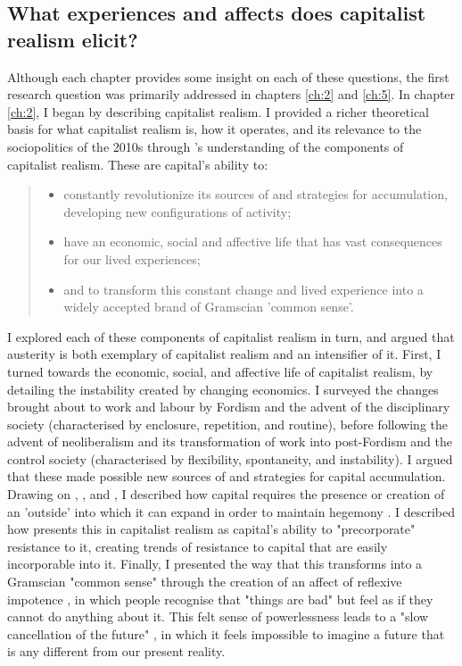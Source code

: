 \subsection{What experiences and affects does capitalist realism elicit?}
\label{subsec:9-2-1}
Although each chapter provides some insight on each of these questions, the first research question was primarily addressed in chapters \ref{ch:2} and \ref{ch:5}. In chapter \ref{ch:2}, I began by describing capitalist realism. I provided a richer theoretical basis for what capitalist realism is, how it operates, and its relevance to the sociopolitics of the 2010s through \citet{shonkwiler_reading_2014}’s understanding of the components of capitalist realism. These are capital’s ability to:
\begin{quote}
\begin{itemize}
\item  constantly revolutionize its sources of and strategies for accumulation, developing new configurations of activity;
\item have an economic, social and affective life that has vast consequences for our lived experiences;
\item and to transform this constant change and lived experience into a widely accepted brand of Gramscian 'common sense'.
\end{itemize}
\end{quote}
I explored each of these components of capitalist realism in turn, and argued that austerity is both exemplary of capitalist realism and an intensifier of it. First, I turned towards the economic, social, and affective life of capitalist realism, by detailing the instability created by changing economics. I surveyed the changes brought about to work and labour by Fordism and the advent of the disciplinary society (characterised by enclosure, repetition, and routine), before following the advent of neoliberalism and its transformation of work into post-Fordism and the control society (characterised by flexibility, spontaneity, and instability). I argued that these made possible new sources of and strategies for capital accumulation. Drawing on \citet{marx_capital_1889}, \citet{luxemburg_accumulation_2015}, and \citet{harvey_new_2003}, I described how capital requires the presence or creation of an 'outside' into which it can expand in order to maintain hegemony \citep{gramsci_selections_2007}. I described how \citet{fisher_capitalist_2009} presents this in capitalist realism as capital's ability to "precorporate" resistance to it, creating trends of resistance to capital that are easily incorporable into it. Finally, I presented the way that this transforms into a Gramscian "common sense" through the creation of an affect of reflexive impotence \citep[24]{fisher_capitalist_2009}, in which people recognise that "things are bad" but feel as if they cannot do anything about it. This felt sense of powerlessness leads to a "slow cancellation of the future" \citep[5]{fisher_ghosts_2014}, in which it feels impossible to imagine a future that is any different from our present reality.

